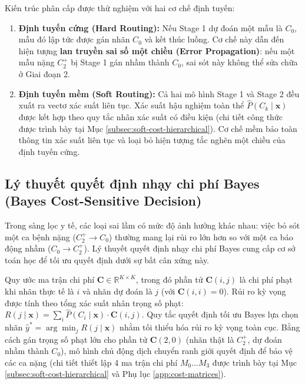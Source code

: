 Kiến trúc phân cấp được thử nghiệm với hai cơ chế định tuyến:
\begin{enumerate}
    \item \textbf{Định tuyến cứng (Hard Routing):} Nếu Stage 1 dự đoán một mẫu là $C_0$, mẫu đó lập tức được gán nhãn $C_0$ và kết thúc luồng. Cơ chế này dẫn đến hiện tượng \textbf{lan truyền sai số một chiều (Error Propagation)}: nếu một mẫu nặng $C_2^+$ bị Stage 1 gán nhầm thành $C_0$, sai sót này không thể sửa chữa ở Giai đoạn 2.
    \item \textbf{Định tuyến mềm (Soft Routing):} Cả hai mô hình Stage 1 và Stage 2 đều xuất ra vectơ xác suất liên tục. Xác suất hậu nghiệm toàn thể $\hat{P}(C_k \mid \mathbf{x})$ được kết hợp theo quy tắc nhân xác suất có điều kiện (chi tiết công thức được trình bày tại Mục \ref{subsec:soft-cost-hierarchical}). Cơ chế mềm bảo toàn thông tin xác suất liên tục và loại bỏ hiện tượng tắc nghẽn một chiều của định tuyến cứng.
\end{enumerate}

\subsection{Lý thuyết quyết định nhạy chi phí Bayes (Bayes Cost-Sensitive Decision)}
\label{subsec:cost-sensitive-paradigm}

Trong sàng lọc y tế, các loại sai lầm có mức độ ảnh hưởng khác nhau: việc bỏ sót một ca bệnh nặng ($C_2^+ \to C_0$) thường mang lại rủi ro lớn hơn so với một ca báo động nhầm ($C_0 \to C_2^+$). Lý thuyết quyết định nhạy chi phí Bayes \cite{elkan2001foundations} cung cấp cơ sở toán học để tối ưu quyết định dưới sự bất cân xứng này.

Quy ước ma trận chi phí $\mathbf{C} \in \mathbb{R}^{K \times K}$, trong đó phần tử $\mathbf{C}(i, j)$ là chi phí phạt khi nhãn thực tế là $i$ và nhãn dự đoán là $j$ (với $\mathbf{C}(i, i) = 0$). Rủi ro kỳ vọng được tính theo tổng xác suất nhân trọng số phạt: $R(j \mid \mathbf{x}) = \sum_{i} \hat{P}(C_i \mid \mathbf{x}) \cdot \mathbf{C}(i, j)$. Quy tắc quyết định tối ưu Bayes lựa chọn nhãn $\hat{y}^* = \arg\min_j R(j \mid \mathbf{x})$ nhằm tối thiểu hóa rủi ro kỳ vọng toàn cục. Bằng cách gán trọng số phạt lớn cho phần tử $\mathbf{C}(2, 0)$ (nhãn thật là $C_2^+$, dự đoán nhầm thành $C_0$), mô hình chủ động dịch chuyển ranh giới quyết định để bảo vệ các ca nặng (chi tiết thiết lập 4 ma trận chi phí $M_0 \dots M_3$ được trình bày tại Mục \ref{subsec:soft-cost-hierarchical} và Phụ lục \ref{app:cost-matrices}).

